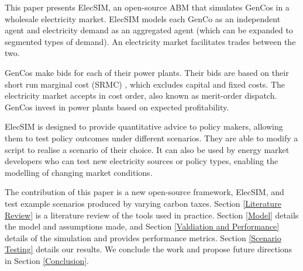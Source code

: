 This paper presents ElecSIM, an open-source ABM that simulates GenCos in a wholesale electricity market. ElecSIM models each GenCo as an independent agent and electricity demand as an aggregated agent (which can be expanded to segmented types of demand). An electricity market facilitates trades between the two. 

GenCos make bids for each of their power plants. Their bids are based on their short run marginal cost (SRMC) \cite{Perloff2012}, which excludes capital and fixed costs. The electricity market accepts in cost order, also known as merit-order dispatch. GenCos invest in power plants based on expected profitability.	

ElecSIM is designed to provide quantitative advice to policy makers, allowing them to test policy outcomes under different scenarios. They are able to modify a script to realise a scenario of their choice. It can also be used by energy market developers who can test new electricity sources or policy types, enabling the modelling of changing market conditions.







The contribution of this paper is a new open-source framework, ElecSIM, and test example scenarios produced by varying carbon taxes. Section \ref{Literature Review} is a literature review of the tools used in practice. Section \ref{Model} details the model and assumptions made, and Section \ref{Valdiation and Performance} details of the simulation and provides performance metrics. Section \ref{Scenario Testing} details our results. We conclude the work and propose future directions in Section \ref{Conclusion}.


